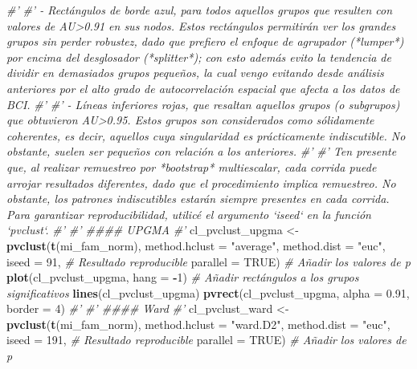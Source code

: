 \documentclass[11pt,]{article}
\newenvironment{Shaded}{\begin{snugshade}}{\end{snugshade}}
\newcommand{\KeywordTok}[1]{\textcolor[rgb]{0.13,0.29,0.53}{\textbf{#1}}}
\newcommand{\DataTypeTok}[1]{\textcolor[rgb]{0.13,0.29,0.53}{#1}}
\newcommand{\DecValTok}[1]{\textcolor[rgb]{0.00,0.00,0.81}{#1}}
\newcommand{\FloatTok}[1]{\textcolor[rgb]{0.00,0.00,0.81}{#1}}
\newcommand{\StringTok}[1]{\textcolor[rgb]{0.31,0.60,0.02}{#1}}
\newcommand{\CommentTok}[1]{\textcolor[rgb]{0.56,0.35,0.01}{\textit{#1}}}
\newcommand{\OtherTok}[1]{\textcolor[rgb]{0.56,0.35,0.01}{#1}}
\newcommand{\OperatorTok}[1]{\textcolor[rgb]{0.81,0.36,0.00}{\textbf{#1}}}
\newcommand{\NormalTok}[1]{#1}
\begin{document}
\begin{Shaded}
\begin{Highlighting}[]
{{{\CommentTok{#' }
\CommentTok{#' - Rectángulos de borde azul, para todos aquellos grupos que resulten con valores de AU>0.91 en sus nodos. Estos rectángulos permitirán ver los grandes grupos sin perder robustez, dado que prefiero el enfoque de agrupador (*lumper*) por encima del desglosador (*splitter*); con esto además evito la tendencia de dividir en demasiados grupos pequeños, la cual vengo evitando desde análisis anteriores por el alto grado de autocorrelación espacial que afecta a los datos de BCI.}
\CommentTok{#' }
\CommentTok{#' - Líneas inferiores rojas, que resaltan aquellos grupos (o subgrupos) que obtuvieron AU>0.95. Estos grupos son considerados como sólidamente coherentes, es decir, aquellos cuya singularidad es prácticamente indiscutible. No obstante, suelen ser pequeños con relación a los anteriores.}
\CommentTok{#' }
\CommentTok{#' Ten presente que, al realizar remuestreo por *bootstrap* multiescalar, cada corrida puede arrojar resultados diferentes, dado que el procedimiento implica remuestreo. No obstante, los patrones indiscutibles estarán siempre presentes en cada corrida. Para garantizar reproducibilidad, utilicé el argumento `iseed` en la función `pvclust`.}
\CommentTok{#' }
\CommentTok{#' #### UPGMA}
\CommentTok{#' }
\NormalTok{cl_pvclust_upgma <-}
\StringTok{  }\KeywordTok{pvclust}\NormalTok{(}\KeywordTok{t}\NormalTok{(mi_fam_norm),}
          \DataTypeTok{method.hclust =} \StringTok{"average"}\NormalTok{,}
          \DataTypeTok{method.dist =} \StringTok{"euc"}\NormalTok{,}
          \DataTypeTok{iseed =} \DecValTok{91}\NormalTok{, }\CommentTok{# Resultado reproducible}
          \DataTypeTok{parallel =} \OtherTok{TRUE}\NormalTok{)}
\CommentTok{# Añadir los valores de p}
\KeywordTok{plot}\NormalTok{(cl_pvclust_upgma, }\DataTypeTok{hang =} \OperatorTok{-}\DecValTok{1}\NormalTok{)}
\CommentTok{# Añadir rectángulos a los grupos significativos}
\KeywordTok{lines}\NormalTok{(cl_pvclust_upgma)}
\KeywordTok{pvrect}\NormalTok{(cl_pvclust_upgma, }\DataTypeTok{alpha =} \FloatTok{0.91}\NormalTok{, }\DataTypeTok{border =} \DecValTok{4}\NormalTok{)}
\CommentTok{#' }
\CommentTok{#' #### Ward}
\CommentTok{#' }
\NormalTok{cl_pvclust_ward <-}
\StringTok{  }\KeywordTok{pvclust}\NormalTok{(}\KeywordTok{t}\NormalTok{(mi_fam_norm),}
          \DataTypeTok{method.hclust =} \StringTok{"ward.D2"}\NormalTok{,}
          \DataTypeTok{method.dist =} \StringTok{"euc"}\NormalTok{,}
          \DataTypeTok{iseed =} \DecValTok{191}\NormalTok{, }\CommentTok{# Resultado reproducible}
          \DataTypeTok{parallel =} \OtherTok{TRUE}\NormalTok{)}
\CommentTok{# Añadir los valores de p}
}}}
\end{Highlighting}
\end{Shaded}
\end{document}
